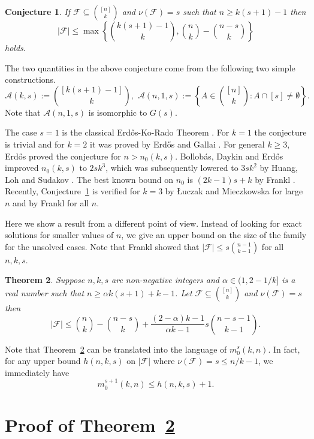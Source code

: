 \documentclass{amsart}
\newtheorem{theorem}{Theorem}
\theoremstyle{plain}
\newtheorem{conjecture}[theorem]{Conjecture}
\numberwithin{equation}{section}
\numberwithin{theorem}{section}
\numberwithin{case}{section}
\numberwithin{subcase}{case}
\begin{document}
\begin{conjecture}\cite{erdos65}\label{conj:erdos}
If ${\mathcal{F}}\subseteq \binom{[n]}{k}$ and $\nu({\mathcal{F}}) = s$ such that $n\ge k(s + 1) - 1$ then
\[
|{\mathcal{F}}|\le \max \left\{ \binom{k(s + 1) - 1}{k}, \binom nk - \binom{n-s}k \right\}
\]
holds.
\end{conjecture}

The two quantities in the above conjecture come from the following two simple constructions.
\[
{\mathcal{A}}(k,s):= \binom{[k(s+1)-1]}{k}, \, \,  {\mathcal{A}}(n,1,s) := \left \{ A\in \binom{[n]}{k} : A\cap [s]\neq\emptyset \right\}.
\]
Note that $ {\mathcal{A}}(n,1,s)$ is isomorphic to $G(s)$.

The case $s=1$ is the classical Erd\H{o}s-Ko-Rado Theorem \cite{EKR}.
For $k=1$ the conjecture is trivial and for $k=2$ it was proved by Erd\H{o}s and Gallai \cite{ErGa59}.
For general $k\ge 3$, Erd\H{o}s \cite{erdos65} proved the conjecture for $n > n_0(k,s)$.
Bollob\'as, Daykin and Erd\H{o}s \cite{BDE76} improved $n_0(k,s)$ to $2s k^3$, which was subsequently lowered to $3s k^2$ by Huang, Loh and Sudakov \cite{HLS}.
The best known bound on $n_0$ is $(2k - 1)s + k$ by Frankl \cite{Frankl13}.
Recently, Conjecture~\ref{conj:erdos} is verified for $k=3$ by {\L}uczak and Mieczkowska \cite{LuMi14} for large $n$ and by Frankl \cite{Frankl12} for all $n$. 

Here we show a result from a different point of view. Instead of looking for exact solutions for smaller values of $n$, we give an upper bound on the size of the family for the unsolved cases.
Note that Frankl \cite{frankl87_survey} showed that $|{\mathcal{F}}|\le s\binom{n-1}{k-1}$ for all $n,k,s$.

\begin{theorem}\label{thm:main}
Suppose $n, k, s$ are non-negative integers and ${\alpha}\in (1,2-1/k]$ is a real number such that $n\ge {\alpha} k(s+1) + k-1$.
Let ${\mathcal{F}}\subseteq \binom{[n]}{k}$ and $\nu({\mathcal{F}}) = s$ then
\[
|{\mathcal{F}}|\le \binom nk - \binom{n-s}k + \frac{(2-{\alpha})k-1}{{\alpha} k-1}s\binom{n-s-1}{k-1}.
\]
\end{theorem}

Note that Theorem~\ref{thm:main} can be translated into the language of $m_0^s(k,n)$.
In fact, for any upper bound $h(n,k,s)$ on $|{\mathcal{F}}|$ where $\nu({\mathcal{F}})=s\le n/k-1$, we immediately have
\[
m_0^{s+1}(k,n) \le h(n,k,s)+1.
\]

\section{Proof of Theorem~\ref{thm:main}}
\end{document}
